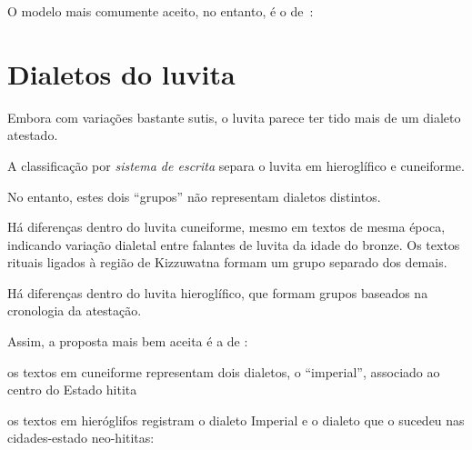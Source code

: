 \documentclass[article]{luvita}
\begin{document}
\begin{compactitem}
\begin{compactitem}
\begin{compactitem}
\begin{center}
			\end{center}
			\item O modelo mais comumente aceito, no entanto, é o
			de~\citet[92]{Oettinger1978}:
			\begin{center}
			\end{center}
		\end{compactitem}
	\end{compactitem}
\end{compactitem}

\section{Dialetos do luvita}

Embora com variações bastante sutis, o luvita parece ter tido mais de um dialeto
atestado.

\begin{compactitem}
	\item A classificação por \emph{sistema de escrita} separa o luvita em
	hieroglífico e cuneiforme.
	\item  No entanto, estes dois ``grupos'' não representam dialetos distintos.
	\item Há diferenças dentro do luvita cuneiforme, mesmo em textos de mesma
	época, indicando variação dialetal entre falantes de luvita da idade do
	bronze. Os textos rituais ligados à região de Kizzuwatna formam um grupo separado
	dos demais.
	\item Há diferenças dentro do luvita hieroglífico, que formam grupos baseados
	na cronologia da atestação.
	\item Assim, a proposta mais bem aceita é a de \citet{Yakubovich2010}:
	\begin{compactitem}
		\item os textos em cuneiforme representam dois
		dialetos, o ``imperial'', associado ao centro do Estado hitita
		\item os textos em hieróglifos registram o dialeto Imperial e o dialeto que o
		sucedeu nas cidades-estado neo-hititas:
	\end{compactitem}
	\begin{center}
	\end{center}
\end{compactitem}
\end{document}
